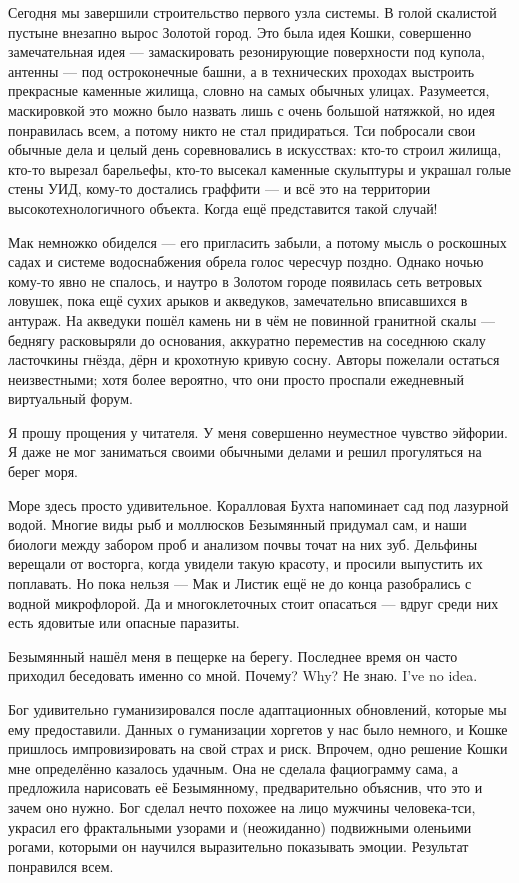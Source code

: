 Сегодня мы завершили строительство первого узла системы.
В голой скалистой пустыне внезапно вырос Золотой город.
Это была идея Кошки, совершенно замечательная идея --- замаскировать резонирующие поверхности под купола, антенны --- под остроконечные башни, а в технических проходах выстроить прекрасные каменные жилища, словно на самых обычных улицах.
Разумеется, маскировкой это можно было назвать лишь с очень большой натяжкой, но идея понравилась всем, а потому никто не стал придираться.
Тси побросали свои обычные дела и целый день соревновались в искусствах: кто-то строил жилища, кто-то вырезал барельефы, кто-то высекал каменные скульптуры и украшал голые стены УИД, кому-то достались граффити --- и всё это на территории высокотехнологичного объекта.
Когда ещё представится такой случай!

Мак немножко обиделся --- его пригласить забыли, а потому мысль о роскошных садах и системе водоснабжения обрела голос чересчур поздно.
Однако ночью кому-то явно не спалось, и наутро в Золотом городе появилась сеть ветровых ловушек, пока ещё сухих арыков и акведуков, замечательно вписавшихся в антураж.
На акведуки пошёл камень ни в чём не повинной гранитной скалы --- беднягу расковыряли до основания, аккуратно переместив на соседнюю скалу ласточкины гнёзда, дёрн и крохотную кривую сосну.
Авторы пожелали остаться неизвестными;
хотя более вероятно, что они просто проспали ежедневный виртуальный форум.

Я прошу прощения у читателя.
У меня совершенно неуместное чувство эйфории.
Я даже не мог заниматься своими обычными делами и решил прогуляться на берег моря.

Море здесь просто удивительное.
Коралловая Бухта напоминает сад под лазурной водой.
Многие виды рыб и моллюсков Безымянный придумал сам, и наши биологи между забором проб и анализом почвы точат на них зуб.
Дельфины верещали от восторга, когда увидели такую красоту, и просили выпустить их поплавать.
Но пока нельзя --- Мак и Листик ещё не до конца разобрались с водной микрофлорой.
Да и многоклеточных стоит опасаться --- вдруг среди них есть ядовитые или опасные паразиты.

Безымянный нашёл меня в пещерке на берегу.
Последнее время он часто приходил беседовать именно со мной.
{Почему?}
{Why?}
{Не знаю.}
{I've no idea.}

Бог удивительно гуманизировался после адаптационных обновлений, которые мы ему предоставили.
Данных о гуманизации хоргетов у нас было немного, и Кошке пришлось импровизировать на свой страх и риск.
Впрочем, одно решение Кошки мне определённо казалось удачным.
Она не сделала фациограмму сама, а предложила нарисовать её Безымянному, предварительно объяснив, что это и зачем оно нужно.
Бог сделал нечто похожее на лицо мужчины человека-тси, украсил его фрактальными узорами и (неожиданно) подвижными оленьими рогами, которыми он научился выразительно показывать эмоции.
Результат понравился всем.

